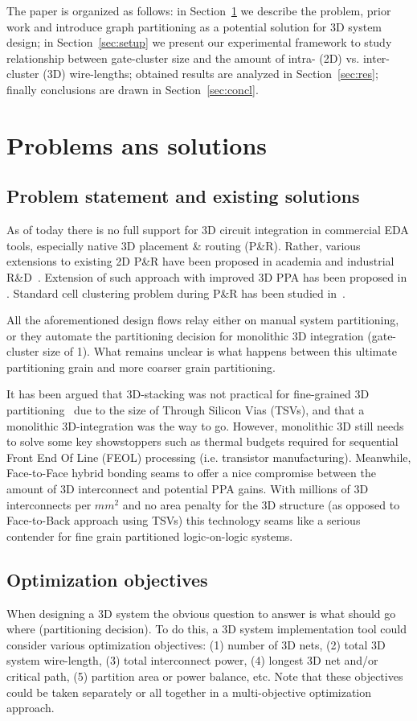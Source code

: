 \documentclass[conference]{IEEEtran}
\begin{document}
The paper is organized as follows: in Section~\ref{sec:optobj} we describe the problem, prior work and introduce graph partitioning as a potential solution for 3D system design; in Section~\ref{sec:setup} we present our experimental framework to study relationship between gate-cluster size and the amount of intra- (2D) vs. inter-cluster (3D) wire-lengths; obtained results are analyzed in Section~\ref{sec:res}; finally conclusions are drawn in Section~\ref{sec:concl}.

\section{Problems ans solutions}\label{sec:optobj}
\subsection{Problem statement and existing solutions}
As of today there is no full support for 3D circuit integration in commercial EDA tools, especially native 3D placement \& routing (P\&R). Rather, various extensions to existing 2D P\&R have been proposed in academia and industrial R\&D~\cite{Panth}. Extension of such approach with improved 3D PPA has been proposed in \cite{Chang2016}. Standard cell clustering problem during P\&R has been studied in~\cite{Moura2017}. 

All the aforementioned design flows relay either on manual system partitioning, or they automate the partitioning decision for monolithic 3D integration (gate-cluster size of 1). What remains unclear is what happens between this ultimate partitioning grain and more coarser grain partitioning.  

It has been argued that 3D-stacking was not practical for fine-grained 3D partitioning~\cite{Samal2017} due to the size of Through Silicon Vias (TSVs), and that a monolithic 3D-integration was the way to go. However, monolithic 3D still needs to solve some key showstoppers such as thermal budgets required for sequential Front End Of Line (FEOL) processing (i.e. transistor manufacturing). Meanwhile, Face-to-Face hybrid bonding seams to offer a nice compromise between the amount of 3D interconnect and potential PPA gains. With millions of 3D interconnects per $mm^2$ and no area penalty for the 3D structure (as opposed to Face-to-Back approach using TSVs) this technology seams like a serious contender for fine grain partitioned logic-on-logic systems.

\subsection{Optimization objectives}
When designing a 3D system the obvious question to answer is what should go where (partitioning decision). To do this, a 3D system implementation tool could consider various optimization objectives: (1) number of 3D nets, (2) total 3D system wire-length, (3) total interconnect power, (4) longest 3D net and/or critical path, (5) partition area or power balance, etc. Note that these objectives could be taken separately or all together in a multi-objective optimization approach.
\end{document}
